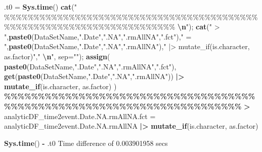 \documentclass[
]{article}
\newenvironment{Shaded}{\begin{snugshade}}{\end{snugshade}}
\newcommand{\AttributeTok}[1]{\textcolor[rgb]{0.13,0.29,0.53}{#1}}
\newcommand{\ErrorTok}[1]{\textcolor[rgb]{0.64,0.00,0.00}{\textbf{#1}}}
\newcommand{\FloatTok}[1]{\textcolor[rgb]{0.00,0.00,0.81}{#1}}
\newcommand{\FunctionTok}[1]{\textcolor[rgb]{0.13,0.29,0.53}{\textbf{#1}}}
\newcommand{\NormalTok}[1]{#1}
\newcommand{\OtherTok}[1]{\textcolor[rgb]{0.56,0.35,0.01}{#1}}
\newcommand{\SpecialCharTok}[1]{\textcolor[rgb]{0.81,0.36,0.00}{\textbf{#1}}}
\newcommand{\StringTok}[1]{\textcolor[rgb]{0.31,0.60,0.02}{#1}}
\begin{document}
\begin{Shaded}
\begin{Highlighting}[]
  
\NormalTok{.t0 }\OtherTok{=} \FunctionTok{Sys.time}\NormalTok{()}
\FunctionTok{cat}\NormalTok{(}\StringTok{"    \%\%\%\%\%\%\%\%\%\%\%\%\%\%\%\%\%\%\%\%\%\%\%\%\%\%\%\%\%\%\%\%\%\%\%\%\%\%\%\%\%\%\%\%\%\%\%\%\%\%\%\%\%\%\%\%\%\%\%\%\%\%\%\%\%\%\%\%\%\%\%\%    }\SpecialCharTok{\textbackslash{}n}\StringTok{"}\NormalTok{); }\FunctionTok{cat}\NormalTok{(}\StringTok{" \textgreater{} "}\NormalTok{,}\FunctionTok{paste0}\NormalTok{(DataSetName,}\StringTok{".Date"}\NormalTok{,}\StringTok{".NA"}\NormalTok{,}\StringTok{".rmAllNA"}\NormalTok{,}\StringTok{".fct"}\NormalTok{),}\StringTok{" = "}\NormalTok{,}\FunctionTok{paste0}\NormalTok{(DataSetName,}\StringTok{".Date"}\NormalTok{,}\StringTok{".NA"}\NormalTok{,}\StringTok{".rmAllNA"}\NormalTok{),}\StringTok{" |\textgreater{} mutate\_if(is.character, as.factor)"}\NormalTok{,}\StringTok{"  }\SpecialCharTok{\textbackslash{}n}\StringTok{"}\NormalTok{, }\AttributeTok{sep=}\StringTok{""}\NormalTok{); }\FunctionTok{assign}\NormalTok{( }\FunctionTok{paste0}\NormalTok{(DataSetName,}\StringTok{".Date"}\NormalTok{,}\StringTok{".NA"}\NormalTok{,}\StringTok{".rmAllNA"}\NormalTok{,}\StringTok{".fct"}\NormalTok{), }\FunctionTok{get}\NormalTok{(}\FunctionTok{paste0}\NormalTok{(DataSetName,}\StringTok{".Date"}\NormalTok{,}\StringTok{".NA"}\NormalTok{,}\StringTok{".rmAllNA"}\NormalTok{)) }\SpecialCharTok{|\textgreater{}} \FunctionTok{mutate\_if}\NormalTok{(is.character, as.factor) )}
    \SpecialCharTok{\%\%\%\%\%\%\%\%\%\%\%\%\%\%\%\%\%\%\%\%\%\%\%\%\%\%\%\%\%\%\%\%\%\%\%\%\%\%\%\%\%\%\%\%\%\%\%\%\%\%\%\%\%\%\%\%\%\%\%\%\%\%\%\%\%\%\%\%\%\%\%\%}    
 \ErrorTok{\textgreater{}}\NormalTok{ analyticDF\_time2event.Date.NA.rmAllNA.fct }\OtherTok{=}\NormalTok{ analyticDF\_time2event.Date.NA.rmAllNA }\SpecialCharTok{|\textgreater{}} \FunctionTok{mutate\_if}\NormalTok{(is.character, as.factor)  }
\end{Highlighting}
\end{Shaded}

\begin{Shaded}
\begin{Highlighting}[]
\FunctionTok{Sys.time}\NormalTok{() }\SpecialCharTok{{-}}\NormalTok{ .t0}
\NormalTok{Time difference of }\FloatTok{0.003901958}\NormalTok{ secs}
\end{Highlighting}
\end{Shaded}
\end{document}
